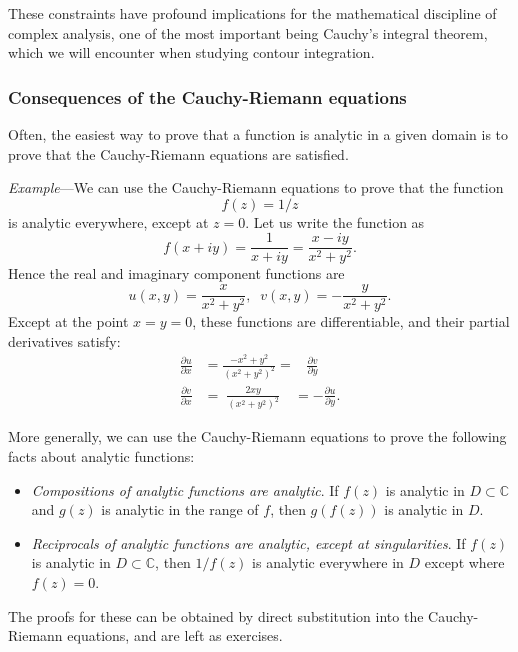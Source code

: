 \documentclass[10pt,a4paper]{article}
\begin{document}
These constraints have profound implications for the mathematical
discipline of complex analysis, one of the most important being
Cauchy's integral theorem, which we will encounter when studying
contour integration.

\subsubsection{Consequences of the Cauchy-Riemann equations}
\label{consequences-of-the-cauchy-riemann-equations}

Often, the easiest way to prove that a function is analytic in a given
domain is to prove that the Cauchy-Riemann equations are satisfied.

\begin{framed} \noindent
  \textit{Example}---We can use the Cauchy-Riemann equations to prove
  that the function\[f(z)=1/z\]is analytic everywhere, except at $z =
  0$. Let us write the function as
  \begin{equation*}
    f(x+iy) = \frac{1}{x+iy} = \frac{x-iy}{x^2+y^2}.
  \end{equation*}
  Hence the real and imaginary component functions are
  \begin{equation*}
    u(x,y) = \frac{x}{x^2+y^2}, \;\;v(x,y) = -
    \frac{y}{x^2+y^2}.
  \end{equation*}
  Except at the point $x = y = 0$, these functions are differentiable,
  and their partial derivatives
  satisfy:
  \begin{align*}
    \frac{\partial u}{\partial x} &=
    \frac{-x^2+y^2}{(x^2+y^2)^2} = \;\;\;\frac{\partial
      v}{\partial y} \\ \frac{\partial v}{\partial x} &= \;
    \frac{2xy}{(x^2+y^2)^2} \;\;\;\,= -\frac{\partial u}{\partial
      y}.
  \end{align*}
\end{framed}

More generally, we can use the Cauchy-Riemann equations to prove the
following facts about analytic functions:
\begin{itemize}
\item
  \emph{Compositions of analytic functions are analytic}. If $f(z)$ is
  analytic in $D \subset \mathbb{C}$ and $g(z)$ is analytic in the
  range of $f$, then $g(f(z))$ is analytic in $D$.
\item
  \emph{Reciprocals of analytic functions are analytic, except at
  singularities}. If $f(z)$ is analytic in $D \subset \mathbb{C}$,
  then $1/f(z)$ is analytic everywhere in $D$ except where
  $f(z) = 0$.
\end{itemize}
The proofs for these can be obtained by direct substitution into the
Cauchy-Riemann equations, and are left as exercises.
\end{document}
